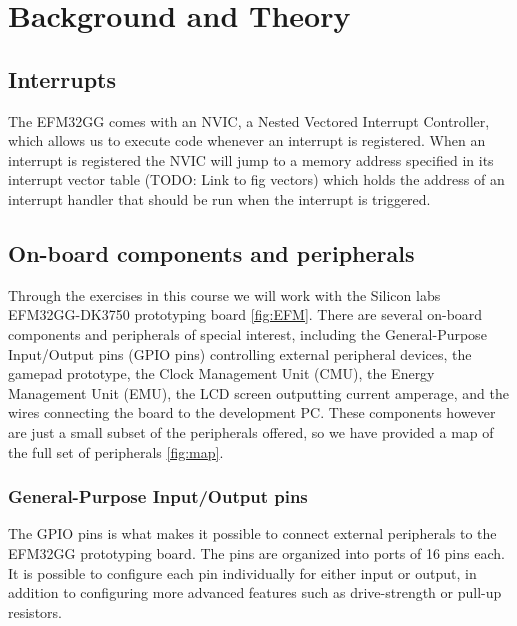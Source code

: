 \chapter{Background and Theory}



\section{Interrupts}

The EFM32GG comes with an NVIC, a Nested Vectored Interrupt Controller, which allows us to execute code whenever an interrupt is registered. When an interrupt is registered the NVIC will jump to a memory address specified in its interrupt vector table (TODO: Link to fig vectors) which holds the address of an interrupt handler that should be run when the interrupt is triggered.

\section{On-board components and peripherals}

Through the exercises in this course we will work with the  Silicon labs EFM32GG-DK3750 prototyping board \ref{fig:EFM}. There are several on-board components and peripherals of special interest, including the General-Purpose Input/Output pins (GPIO pins) controlling external peripheral devices, the gamepad prototype, the Clock Management Unit (CMU), the Energy Management Unit (EMU), the LCD screen outputting current amperage, and the wires connecting the board to the development PC. These components however are just a small subset of the peripherals offered, so we have provided a map of the full set of peripherals \ref{fig:map}.

\subsection{General-Purpose Input/Output pins}
The GPIO pins is what makes it possible to connect external peripherals to the EFM32GG prototyping board. The pins are organized into ports of 16 pins each. It is possible to configure each pin individually for either input or output, in addition to configuring more advanced features such as drive-strength or pull-up resistors.

